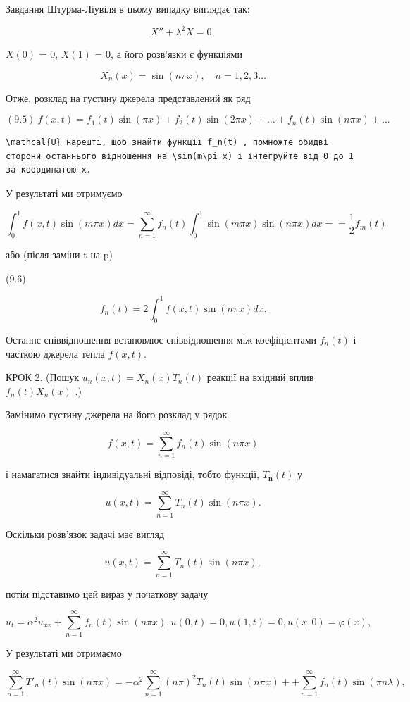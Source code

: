 \documentclass[
  ukrainian,
]{article}
\begin{document}
Завдання Штурма-Ліувіля в цьому випадку виглядає так:

\[
X'' + \lambda^2 X = 0,
\]

\(X(0)\) = 0, \(X(1)\) = 0, а його розв'язки є функціями

\[
X_n(x) = \sin(n\pi x), \quad n = 1, 2, 3 \dots
\]

Отже, розклад на густину джерела представлений як ряд

\[
(9.5) \ f(x,t) = f_1(t) \sin(\pi x) + f_2(t) \sin(2\pi x) + \dots + f_n(t) \sin(n\pi x) + \dots
\]

\begin{verbatim}
\mathcal{U} нарешті, щоб знайти функції f_n(t) , помножте обидві сторони останнього відношення на \sin(m\pi x) і інтегруйте від 0 до 1 за координатою x.
\end{verbatim}

У результаті ми отримуємо

\[
\int_{0}^{1} f(x, t) \sin(m\pi x) dx = \sum_{n=1}^{\infty} f_{n}(t) \int_{0}^{1} \sin(m\pi x) \sin(n\pi x) dx =
= \frac{1}{2} f_{m}(t)
\]

або (після заміни t на p)

(9.6)

\[
f_{n}(t) = 2 \int_{0}^{1} f(x, t) \sin(n\pi x) dx.
\]

Останнє співвідношення встановлює співвідношення між коефіцієнтами
\(f_n(t)\) і часткою джерела тепла \(f(x, t)\).

КРОК 2. (Пошук \(u_n(x, t) = X_n(x) T_n(t)\) реакції на вхідний вплив
\(f_n(t) X_n(x)\) .)

Замінимо густину джерела на його розклад у рядок

\[
f(x, t) = \sum_{n=1}^{\infty} f_n(t) \sin(n\pi x)
\]

і намагатися знайти індивідуальні відповіді, тобто функції,
\(T_{\mathbf{n}}(t)\) у

\[
u(x, t) = \sum_{n=1}^{\infty} T_n(t) \sin(n\pi x).
\]

Оскільки розв'язок задачі має вигляд

\[
u(x, t) = \sum_{n=1}^{\infty} T_n(t) \sin(n\pi x),
\]

потім підставимо цей вираз у початкову задачу

\[
u_{t} = \alpha^{2} u_{xx} + \sum_{n=1}^{\infty} f_{n}(t) \sin(n\pi x),
u(0, t) = 0,
u(1, t) = 0,
u(x, 0) = \varphi(x),
\]

У результаті ми отримаємо

\[
\sum_{n=1}^{\infty} T'_n(t) \sin(n\pi x) = -\alpha^2 \sum_{n=1}^{\infty} (n\pi)^2 T_n(t) \sin(n\pi x) + + \sum_{n=1}^{\infty} f_n(t) \sin(\pi n\lambda),
\]
\end{document}
